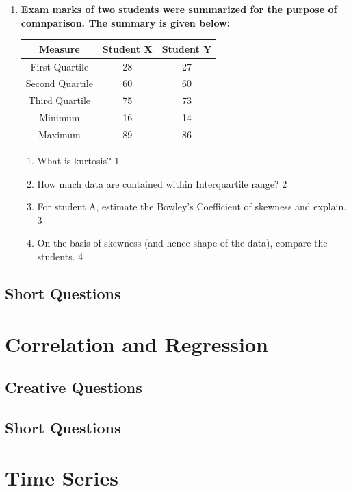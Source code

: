 \documentclass[a4paper,oneside]{book}
\begin{document}
\begin{enumerate}
   \item
	  \textbf{Exam marks of two students were summarized for the purpose of comnparison. The summary is given below:} 
	  
	  \begin{table}[h]
	  \centering
\begin{tabular}{c|c|c}
Measure         & Student X & Student Y \\ \hline
First Quartile  & 28        & 27        \\
Second Quartile & 60        & 60        \\
Third Quartile  & 75        & 73        \\
Minimum         & 16        & 14        \\ 
Maximum         & 89        & 86        \\  \hline
\end{tabular}
\end{table}
  
  \begin{enumerate}
    \item
	What is kurtosis? \hfill 1
    \item
	How much data are contained within Interquartile range? \hfill 2
    \item  
	For student A, estimate the Bowley's Coefficient of skewness and explain. \hfill 3
    \item
	On the basis of skewness (and hence shape of the data), compare the students. \hfill 4
  \end{enumerate}

\end{enumerate}

\section{Short Questions}

\chapter{Correlation and Regression} 
\section{Creative Questions}
\section{Short Questions}

\chapter{Time Series} 
\end{document}
